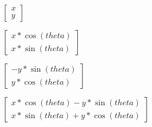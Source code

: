 
$\begin{bmatrix}
    x \\
    y
\end{bmatrix}$

$\begin{bmatrix}
    x * \cos(theta) \\
    x * \sin(theta)
\end{bmatrix}$

$\begin{bmatrix}
    - y * \sin(theta) \\
     y * \cos(theta)
\end{bmatrix}$

$\begin{bmatrix}
    x * \cos(theta) - y * \sin(theta) \\
    x * \sin(theta) + y * \cos(theta)
\end{bmatrix}$

